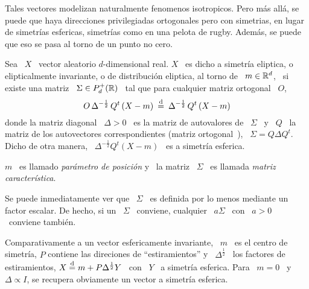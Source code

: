 Tales vectores modelizan naturalmente  fenomenos isotropicos. Pero m\'as all\'a,
se puede que haya direcciones  privilegiadas ortogonales pero con simetrias, \ie
en  lugar  de   simetr\'ias  esfericas,  simetr\'ias  como  en   una  pelota  de
rugby. Adem\'as, se puede que eso se pasa al torno de un punto no cero.
%
\begin{definicion}
  Sea  \  $X$  \ vector  aleatorio  $d$-dimensional  real.   $X$  \ es  dicho  a
  simetr\'ia  eliptica,   o  elipticalmente  invariante,   o  de  distribuci\'on
  eliptica, al torno de \ $m \in  \mathbb{R}^d$, \ si existe una matriz \ $\Sigma \in
  P_d^+(\mathbb{R})$ \ tal que para cualquier matriz ortogonal \ $O$,
  \[
  O  \,   \Delta^{-\frac12}  \,  Q^t  \left(   X  -  m  \right)   \:  \stackrel{\mathrm{d}}{=}  \:
  \Delta^{-\frac12} \, Q^t \left( X - m \right)
  \]
  donde la  matriz diagonal \ $\Delta  > 0$ \ es  la matriz de  autovalores de \
  $\Sigma$ \  y \ $Q$ \  la matriz de los  autovectores correspondientes (matriz
  ortogonal~\cite{Bha97, Bha07, HorJoh13}), \ $\Sigma  = Q \Delta Q^t$. Dicho de
  otra manera, \ $\Delta^{-\frac12} Q^t \left(  X - m \right)$ \ es a simetr\'ia
  esferica.

  $m$ \ es llamado {\em par\'ametro de posici\'on} y \ la matriz \ $\Sigma$ \ es
  llamada {\em matriz caracter\'istica}.
\end{definicion}
%
Se puede inmediatamente  ver que \ $\Sigma$ \ es definida  por lo menos mediante
un factor escalar. De hecho, si un \ $\Sigma$ \ conviene, cualquier \ $a \Sigma$
\ con \ $a > 0$ \ conviene tambi\'en.

Comparativamente a un  vector esfericamente invariante, \ $m$ \  es el centro de
simetr\'ia,   $P$   contiene   las   direciones   de   ``estiramientos''   y   \
$\Delta^{\frac12}$  \   los  factores  de   estiramientos,  $X  \stackrel{\mathrm{d}}{=}  m   +  P
\Delta^{\frac12} Y$ \  con \ $Y$ \ a simetr\'ia  esferica. Para \ $m =  0$ \ y \
$\Delta \propto I$, se recupera obviamente un vector a simetr\'ia esferica.

